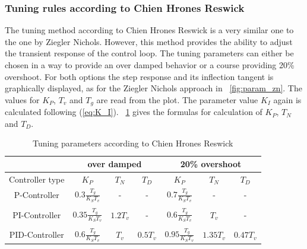 \subsubsection{Tuning rules according to Chien Hrones Reswick}
The tuning method according to Chien Hrones Reswick is a very similar one to the one by Ziegler Nichols. However, this method provides the ability to adjust the transient response of the control loop. The tuning parameters can either be chosen in a way to provide an over damped behavior or a course providing 20\% overshoot. \cite{Reg_11}
For both options the step response and its inflection tangent is graphically displayed, as for the Ziegler Nichols approach in \figurename~\ref{fig:param_zn}.
The values for $K_{P}$, $T_{v}$ and $T_{g}$ are read from the plot. The parameter value $K_{I}$ again is calculated following (\ref{eq:K_I}). \tablename~\ref{tab:param_chr} gives the formulas for calculation of $K_{P}$,  $T_{N}$ and $T_{D}$.

\begin{table}
  \centering
  \begin{tabular}{c|ccc|ccc}
    \toprule
     & \multicolumn{3}{c|}{over damped} & \multicolumn{3}{c}{20\% overshoot} \\
    \midrule
    Controller type & $K_{P}$ &  $T_{N}$ & $T_{D}$ & $K_{P}$ &  $T_{N}$ & $T_{D}$ \\
    \midrule
    P-Controller & $0.3\frac{T_{g}}{K_{S}T_{v}}$ & - & - & $0.7\frac{T_{g}}{K_{S}T_{v}}$ & - & - \\
    & & & & & & \\
    PI-Controller & $0.35\frac{T_{g}}{K_{S}T_{v}}$ & $1.2T_{v}$ & - & $0.6\frac{T_{g}}{K_{S}T_{v}}$ & $T_{v}$ & - \\
        & & & & & & \\
    PID-Controller & $0.6\frac{T_{g}}{K_{S}T_{v}}$ & $T_{v}$ & $0.5T_{v}$ & $0.95\frac{T_{g}}{K_{S}T_{v}}$ & $1.35T_{v}$ & $0.47T_{v}$\\
    \bottomrule
\end{tabular}
  \caption[Tuning parameters Chien Hrones Reswick]{Tuning parameters according to Chien Hrones Reswick}
  \label{tab:param_chr}
\end{table}

